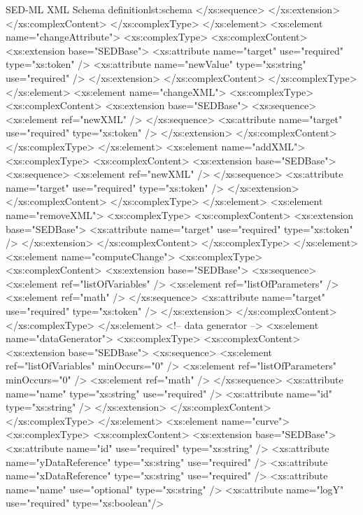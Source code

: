 \begin{myXmlLst}{SED-ML XML Schema definition}{lst:schema}
			 </xs:sequence>
		</xs:extension>
		</xs:complexContent>
		</xs:complexType>
 	</xs:element>
	<xs:element name="changeAttribute">
		<xs:complexType>
		<xs:complexContent>
		<xs:extension base="SEDBase">
			<xs:attribute name="target" use="required" type="xs:token" />
			<xs:attribute name="newValue" type="xs:string" use="required" />
		</xs:extension>
		</xs:complexContent>
		</xs:complexType>
	</xs:element>
	<xs:element name="changeXML">
		<xs:complexType>
		<xs:complexContent>
		<xs:extension base="SEDBase">
			<xs:sequence>
				<xs:element ref="newXML" />
			</xs:sequence>
			<xs:attribute name="target" use="required" type="xs:token" />
		</xs:extension>
		</xs:complexContent>
		</xs:complexType>
	</xs:element>
		<xs:element name="addXML">
		<xs:complexType>
		<xs:complexContent>
		<xs:extension base="SEDBase">
			<xs:sequence>
				<xs:element ref="newXML" />
			</xs:sequence>
			<xs:attribute name="target" use="required" type="xs:token" />
		</xs:extension>
		</xs:complexContent>
		</xs:complexType>
	</xs:element>	
	<xs:element name="removeXML">
		<xs:complexType>
		<xs:complexContent>
		<xs:extension base="SEDBase">
			<xs:attribute name="target" use="required" type="xs:token" />
		</xs:extension>
		</xs:complexContent>
		</xs:complexType>
	</xs:element>
	<xs:element name="computeChange">
		<xs:complexType>
		<xs:complexContent>
		<xs:extension base="SEDBase">
			<xs:sequence>
				<xs:element ref="listOfVariables" />
				<xs:element ref="listOfParameters" />
				<xs:element ref="math" />
			</xs:sequence>
			<xs:attribute name="target" use="required" type="xs:token" />
		</xs:extension>
		</xs:complexContent>
		</xs:complexType>
	</xs:element>
	<!-- data generator -->
	<xs:element name="dataGenerator">
		<xs:complexType>
		<xs:complexContent>
		<xs:extension base="SEDBase">
			<xs:sequence>
				<xs:element ref="listOfVariables" minOccurs="0" />
				<xs:element ref="listOfParameters" minOccurs="0" />
				<xs:element ref="math" />
			</xs:sequence>
			<xs:attribute name="name" type="xs:string" use="required" />
			<xs:attribute name="id" type="xs:string" />
		</xs:extension>
		</xs:complexContent>
		</xs:complexType>
	</xs:element>
	<xs:element name="curve">
		<xs:complexType>
		<xs:complexContent>
		<xs:extension base="SEDBase">
		<xs:attribute name="id" use="required" type="xs:string" />
			<xs:attribute name="yDataReference" type="xs:string"
				use="required" />
			<xs:attribute name="xDataReference" type="xs:string"
				use="required" />
			<xs:attribute name="name" use="optional" type="xs:string" />
			<xs:attribute name="logY" use="required" type="xs:boolean"/>

\end{myXmlLst}
